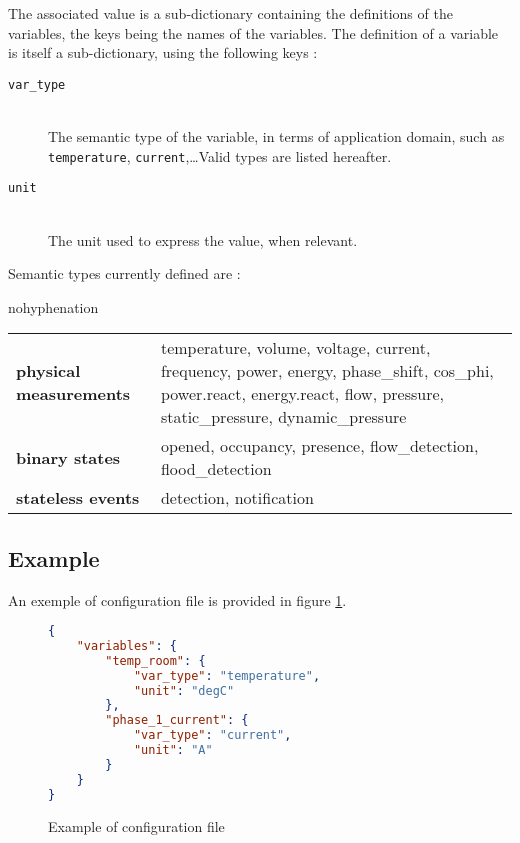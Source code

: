\documentclass[11pt,a4paper]{article}
\begin{document}
The associated value is a sub-dictionary containing the definitions of the variables, the 
keys being the names of the variables. The definition of a variable is itself a 
sub-dictionary, using the following keys :
\begin{description}
\item [\texttt{var\_type}]\hfill\\
The semantic type of the variable, in terms of application domain, such as 
\texttt{temperature}, \texttt{current},\dots Valid types are listed hereafter.
\item [\texttt{unit}]\hfill\\
The unit used to express the value, when relevant.
\end{description}

Semantic types currently defined are :
 
\begin{hyphenrules}{nohyphenation}\begin{sloppypar}
\begin{tabularx}{\textwidth}{lX}
\textbf{physical measurements} &
temperature,
volume,
voltage,
current,
frequency,
power,
energy,
phase\_shift,
cos\_phi,
power.react,
energy.react,
flow,
pressure,
static\_pressure,
dynamic\_pressure \\
\textbf{binary states} &
opened,
occupancy,
presence,
flow\_detection,
flood\_detection \\
\textbf{stateless events} & 
detection,
notification \
\end{tabularx}
\end{sloppypar}\end{hyphenrules}

\subsection{Example}

An exemple of configuration file is provided in figure \ref{fig:config-example}.

\begin{figure}[H]
\begin{center}
\begin{lstlisting}[language=json]
{
    "variables": {
        "temp_room": {
            "var_type": "temperature",
            "unit": "degC"
        },
        "phase_1_current": {
            "var_type": "current",
            "unit": "A"
        }
    }
}
\end{lstlisting}
\end{center}
\caption{Example of configuration file}
\label{fig:config-example}
\end{figure}
\end{document}
